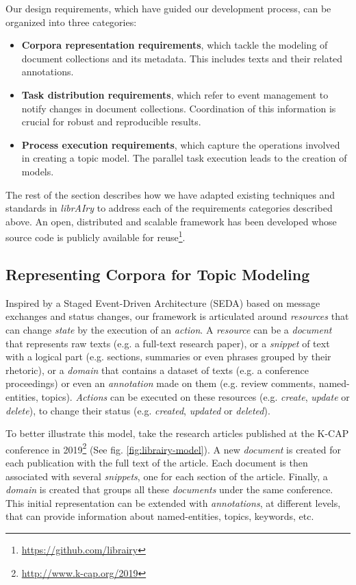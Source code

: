 Our design requirements, which have guided our development process, can be organized into three categories:
\begin{itemize}
\item \textbf{Corpora representation requirements}, which tackle the modeling of document collections and its metadata. This includes texts and their related annotations.
\item \textbf{Task distribution requirements}, which refer to event management to notify changes in document collections. Coordination of this information is crucial for robust and reproducible results.  
\item \textbf{Process execution requirements}, which capture the operations involved in creating a topic model. The parallel task execution leads to the creation of models.
\end{itemize}

The rest of the section describes how we have adapted existing techniques and standards in \textit{librAIry} to address each of the requirements categories described above. An open, distributed and scalable framework has been developed whose source code is publicly available for reuse\footnote{\url{https://github.com/librairy}}.

\subsection{Representing Corpora for Topic Modeling}

Inspired by a Staged Event-Driven Architecture (SEDA) based on message exchanges and status changes, our framework is articulated around \textit{resources} that can change \textit{state} by the execution of an \textit{action}. A \textit{resource} can be a \textit{document} that represents raw texts (e.g. a full-text research paper), or a \textit{snippet} of text with a logical part  (e.g. sections, summaries or even phrases grouped by their rhetoric), or a \textit{domain} that contains a dataset of texts (e.g. a conference proceedings) or even an \textit{annotation} made on them (e.g. review comments, named-entities, topics). \textit{Actions} can be executed on these resources (e.g. \textit{create}, \textit{update} or \textit{delete}), to change their status (e.g. \textit{created}, \textit{updated} or \textit{deleted}).

To better illustrate this model, take the research articles published at the K-CAP conference in 2019\footnote{\url{http://www.k-cap.org/2019}} (See fig. \ref{fig:librairy-model}). A new \textit{document} is created for each publication with the full text of the article. Each document is then associated with several \textit{snippets}, one for each section of the article. Finally, a \textit{domain} is created that groups all these \textit{documents} under the same conference. This initial representation can be extended with \textit{annotations}, at different levels, that can provide information about named-entities, topics, keywords, etc.

